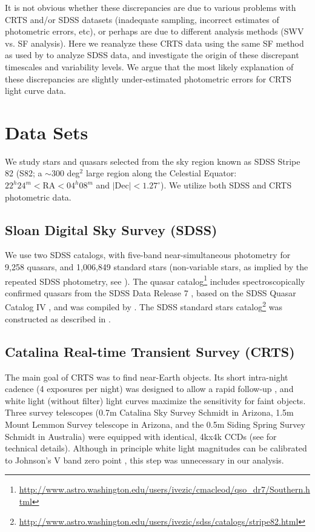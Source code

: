 \documentclass[fleqn,usenatbib]{mnras}  %
\begin{document}
It is not obvious whether these discrepancies are due to various problems with CRTS and/or SDSS datasets
(inadequate sampling, incorrect estimates of photometric errors, etc), or perhaps are due to different analysis 
methods (SWV vs. SF analysis). Here we reanalyze these CRTS data using the same SF method as used by
\cite{macleod2010} to analyze SDSS data, and investigate the origin of these discrepant timescales and 
variability levels. We argue that the most likely explanation of these discrepancies are slightly under-estimated
photometric errors for CRTS light curve data. 


\section{Data Sets}

We study stars and quasars selected from the sky region known as SDSS Stripe 82 (S82; a $\sim$300 deg$^2$ large
region along the Celestial Equator: $22^{h} 24^{m} < \mathrm{RA} < 04^{h} 08^{m}$ and $\mathrm{| Dec |} < 1.27^\circ$). 
We utilize both SDSS and CRTS photometric data. 

\subsection{Sloan Digital Sky Survey (SDSS)}

We use two SDSS catalogs, with five-band near-simultaneous photometry for 9,258  quasars,  and 1,006,849 standard stars
(non-variable stars, as implied by the repeated SDSS photometry, see \citealt{ivezic2007}). 
The quasar catalog\footnote{\url{http://www.astro.washington.edu/users/ivezic/cmacleod/qso_dr7/Southern.html}} includes spectroscopically confirmed quasars from the SDSS Data Release 7 \citep{abazajian2009}, based on the SDSS Quasar Catalog IV \citep{schneider2008, schneider2010}, and was compiled by \cite{macleod2012}. The SDSS standard stars
catalog\footnote{\url{http://www.astro.washington.edu/users/ivezic/sdss/catalogs/stripe82.html}} 
was constructed as described in \cite{ivezic2007}.


\subsection{Catalina Real-time Transient Survey (CRTS) \label{sec:crtsdata}}
The main goal of CRTS was to find near-Earth objects. Its short intra-night cadence (4 exposures per
night) was designed to allow a rapid follow-up \citep{graham2015b}, and white light (without filter) 
light curves maximize the sensitivity for faint objects. Three survey telescopes (0.7m Catalina Sky Survey 
Schmidt in Arizona,  1.5m Mount  Lemmon Survey telescope in Arizona, and the 0.5m Siding Spring Survey 
Schmidt in Australia) were equipped with identical, 4kx4k CCDs (see \cite{djorgovski2011a} for technical details).
Although in principle white light magnitudes can be calibrated to Johnson's V band zero point \citep{drake2013},
this step was unnecessary in our analysis. 
\end{document}
